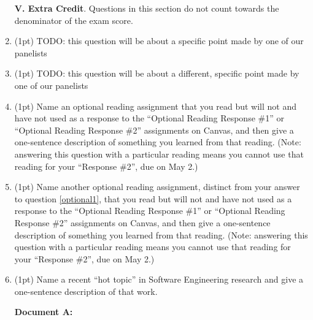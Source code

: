 \documentclass{report}
\newif\ifkey
\newcommand{\answerlong}[1]{\ifkey\color{red}\textbf{#1}\color{black}\else\vspace{0.5in}\fi\xspace}
\newcommand{\ecpts}[1]{\addtocounter{ecpoints}{#1}(#1pt)}
\begin{document}
\begin{spacing}{1.4}
\begin{enumerate}[leftmargin=*]

    \newpage
    
    \textbf{V. Extra Credit}. Questions in this section do not count towards the denominator of the exam score.

  \item \ecpts{1} TODO: this question will be about a specific point made by one of our panelists
    \answerlong{TODO}

  \item \ecpts{1} TODO: this question will be about a different, specific point made by one of our panelists
    \answerlong{TODO}
  
  \item \ecpts{1} \label{optional1} Name an optional reading assignment that you read but will not and have not used as a response to the ``Optional Reading Response \#1''
    or ``Optional Reading Response \#2'' assignments on Canvas, and then give a one-sentence description of something you learned from that reading.
    (Note: answering this question with a particular reading means you cannot use that reading for your ``Response \#2'', due on May 2.)
    \answerlong{Answers vary.}
    
  \item \ecpts{1} Name another optional reading assignment, distinct from your answer to question \ref{optional1},
    that you read but will not and have not used as a response to the ``Optional Reading Response \#1''
    or ``Optional Reading Response \#2'' assignments on Canvas, and then give a one-sentence description of something you learned from that reading.
    (Note: answering this question with a particular reading means you cannot use that reading for your ``Response \#2'', due on May 2.)
    \answerlong{Answers vary.}
    
  \item \ecpts{1} Name a recent ``hot topic'' in Software Engineering research and give a one-sentence description of that work.
    \answerlong{Expected answers are the topics covered in class on 20 April.}
    
    \newpage

    \textbf{Document A:}
    

\end{enumerate}
\end{spacing}
\end{document}
